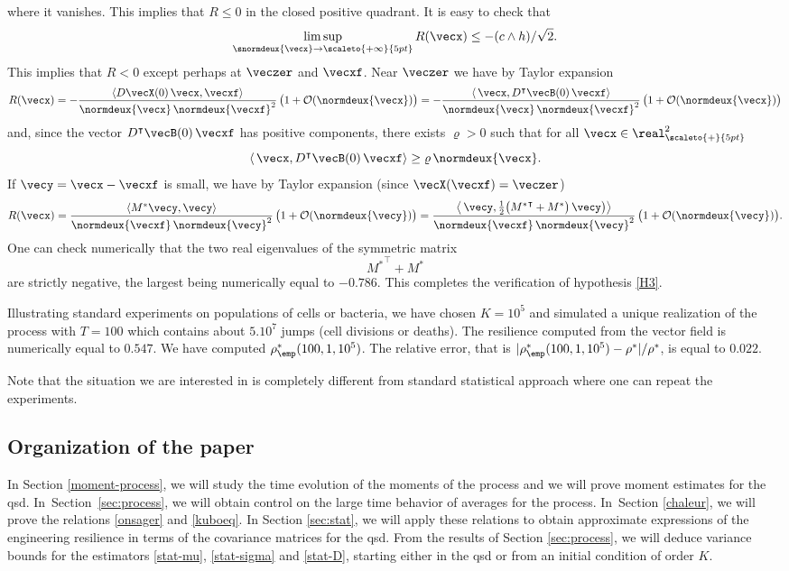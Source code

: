 where it vanishes. This implies that $R\leq 0$ in the closed positive quadrant.
It is easy to check that
\[
\limsup_{\snormdeux{\vecx}\to\scaleto{+\infty}{5pt}} R(\vecx)\leq -(c\wedge h)/\sqrt{2}.
\]
This implies that $R<0$ except perhaps at $\veczer$ and $\vecxf$.
Near $\veczer$ we have by Taylor expansion
\[
R(\vecx)
=-\frac{\langle D\vecX(0)\,\vecx,\vecxf\rangle}{\normdeux{\vecx}\,\normdeux{\vecxf}^{2}}\,
\bigl(1+\mathcal{O}(\normdeux{\vecx})\bigr)=
-\frac{\langle\, \vecx,D^{\intercal}\vecB(0)\,\vecxf
\rangle}{\normdeux{\vecx}\,\normdeux{\vecxf}^{2}}\,
\bigl(1+\mathcal{O}(\normdeux{\vecx})\bigr)
\]
and, since the vector $D^{\intercal}\vecB(0)\,\vecxf$ has positive components, there
exists $\varrho>0$ such that for all $\vecx\in\real_{\scaleto{+}{5pt}}^{\hspace{-.2pt}2}$
\[
\langle\, \vecx,D^{\intercal}\vecB(0)\,\vecxf\rangle\ge \varrho\,\normdeux{\vecx}.
\]
If $\vecy=\vecx-\vecxf$ is small, we have by Taylor expansion (since $\vecX(\vecxf)=\veczer$)
\[
R(\vecx)
=\frac{\langle M^*\vecy,\vecy\rangle}{\normdeux{\vecxf}\,\normdeux{\vecy}^{2}}\,
\bigl(1+\mathcal{O}(\normdeux{\vecy})\bigr)
=\frac{\left\langle\,\vecy,\frac{1}{2}\bigl({M^*}^{\intercal}+M^*\bigr)\,\vecy\bigr)
\right\rangle}{\normdeux{\vecxf}\,\normdeux{\vecy}^{2}}\,
\bigl(1+\mathcal{O}(\normdeux{\vecy})\bigr).
\]
One can check numerically that the two real eigenvalues of the symmetric matrix
\[
{M^*}^{\intercal}+M^*
\]
are strictly negative, the largest being numerically equal to $-0.786$. This completes the verification of hypothesis
\eqref{H3}.

Illustrating standard experiments on populations of cells or bacteria, we have chosen $K=10^5$ and simulated a unique realization of the process with $T=100$ which contains
about $5.10^7$ jumps (cell divisions or deaths).
The resilience computed from the vector field is numerically equal to $0.547$. We have computed $\rho^*_\emp(100,1,10^5)$.
The relative error, that is $|\rho^*_\emp(100,1,10^5)-\rho^*|/\rho^*$, is equal to $0.022$.

Note that the situation we are interested in is completely different from standard statistical approach where one can repeat the experiments.

\subsection{Organization of the paper}

In Section \ref{moment-process}, we will study the time evolution of the moments of the process and we will prove moment
estimates for the qsd.
In~Sec\-tion~\ref{sec:process}, we will obtain control on the large time behavior of averages for the
process. In~Section \ref{chaleur}, we will prove the relations \eqref{onsager} and \eqref{kuboeq}.
In Section \ref{sec:stat}, we will apply these relations to obtain approximate expressions of the engineering resilience in terms of the covariance
matrices for the qsd.
From the results of Section \ref{sec:process}, we will deduce variance bounds for the estimators \eqref{stat-mu}, \eqref{stat-sigma}
and \eqref{stat-D}, starting either in the qsd or from an initial condition of order $K$.

